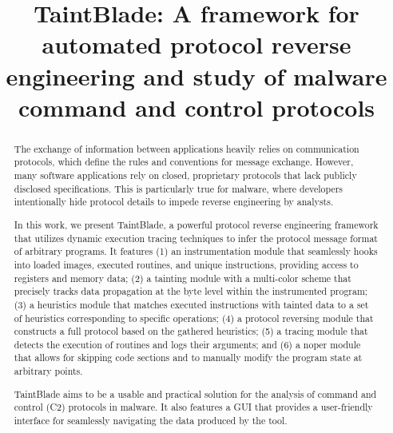\documentclass[conference]{IEEEtran}
\begin{document}
\title{TaintBlade: A framework for automated protocol reverse engineering and study of malware command and control protocols
}

\author{
    \and
}

\maketitle

\begin{abstract}
    The exchange of information between applications heavily relies on 
    communication protocols, which define the rules and conventions for message exchange.
    However, many software applications rely on closed, proprietary protocols that lack publicly
    disclosed specifications. This is particularly true for malware, where developers intentionally 
    hide protocol details to impede reverse engineering by analysts. 

    In this work, we present TaintBlade, a powerful protocol reverse engineering framework 
    that utilizes dynamic execution tracing techniques to infer the protocol message format 
    of arbitrary programs. It features (1) an
    instrumentation module that seamlessly hooks into loaded images, executed routines, 
    and unique instructions, providing access to registers and memory data; 
    (2) a tainting module with a multi-color scheme that precisely tracks data propagation 
    at the byte level within the instrumented program; (3) a heuristics module that matches executed
    instructions with tainted data to a set of heuristics corresponding to specific
    operations; (4) a protocol reversing module that constructs a full protocol
    based on the gathered heuristics; (5) a tracing module that detects the execution 
    of routines and logs their arguments; and (6) a noper module
    that allows for skipping code sections and to manually modify the program state
    at arbitrary points.

    TaintBlade aims to be a usable and practical solution for the analysis of command and control (C2)
    protocols in malware. It also features a GUI that provides a user-friendly interface for seamlessly navigating
    the data produced by the tool.
\end{abstract}
\end{document}
